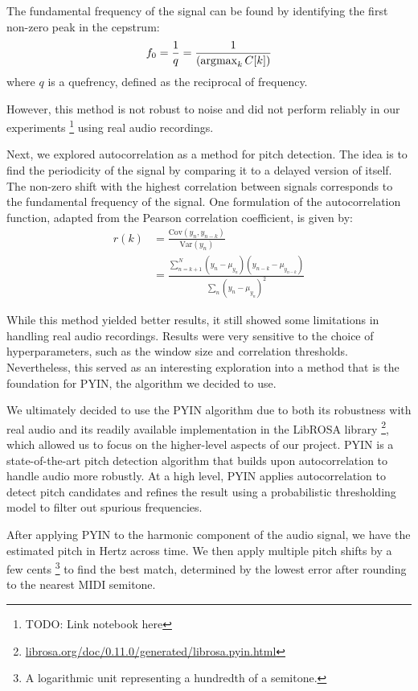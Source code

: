 The fundamental frequency of the signal can be found by identifying the first non-zero peak in the cepstrum:
$$f_0 = \frac{1}{q} = \frac{1}{\left(\operatorname*{\arg\!\max}_{k} C[k]\right)}$$
where $q$ is a quefrency, defined as the reciprocal of frequency.

However, this method is not robust to noise and did not perform reliably in our experiments \footnote{TODO: Link notebook here} using real audio recordings.


Next, we explored autocorrelation as a method for pitch detection. The idea is to find the periodicity of the signal by comparing it to a delayed version of itself. The non-zero shift with the highest correlation between signals corresponds to the fundamental frequency of the signal. One formulation of the autocorrelation function, adapted from the Pearson correlation coefficient, is given by:
\begin{align*}
    r(k)
    &= \frac{\text{Cov}(y_n, y_{n-k})}{\text{Var}(y_n)} \\
    &= \frac{\sum_{n=k+1}^N (y_n - \mu_{y_n}) (y_{n-k} - \mu_{y_{n-k}})}{\sum_n (y_n - \mu_{y_n})^2}
\end{align*}

While this method yielded better results, it still showed some limitations in handling real audio recordings. Results were very sensitive to the choice of hyperparameters, such as the window size and correlation thresholds. Nevertheless, this served as an interesting exploration into a method that is the foundation for PYIN, the algorithm we decided to use.


We ultimately decided to use the PYIN algorithm \autocite{PYIN:2014} due to both its robustness with real audio and its readily available implementation in the LibROSA library \footnote{\href{https://librosa.org/doc/0.11.0/generated/librosa.pyin.html}{librosa.org/doc/0.11.0/generated/librosa.pyin.html}}, which allowed us to focus on the higher-level aspects of our project. PYIN is a state-of-the-art pitch detection algorithm that builds upon autocorrelation to handle audio more robustly. At a high level, PYIN applies autocorrelation to detect pitch candidates and refines the result using a probabilistic thresholding model to filter out spurious frequencies.

After applying PYIN to the harmonic component of the audio signal, we have the estimated pitch in Hertz across time. We then apply multiple pitch shifts by a few cents \footnote{A logarithmic unit representing a hundredth of a semitone.} to find the best match, determined by the lowest error after rounding to the nearest MIDI semitone.

